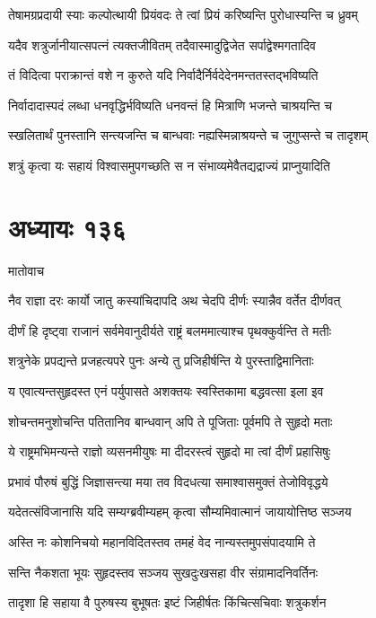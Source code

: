 \twolineshloka
{तेषामग्रप्रदायी स्याः कल्पोत्थायी प्रियंवदः}
{ते त्वां प्रियं करिष्यन्ति पुरोधास्यन्ति च ध्रुवम्}


\twolineshloka
{यदैव शत्रुर्जानीयात्सपत्नं त्यक्तजीवितम्}
{तदैवास्मादुद्विजेत सर्पाद्वेश्मगतादिव}


\twolineshloka
{तं विदित्वा पराक्रान्तं वशे न कुरुते यदि}
{निर्वादैर्निर्वदेदेनमन्ततस्तद्भविष्यति}


\twolineshloka
{निर्वादादास्पदं लब्धा धनवृद्धिर्भविष्यति}
{धनवन्तं हि मित्राणि भजन्ते चाश्रयन्ति च}


\twolineshloka
{स्खलितार्थं पुनस्तानि सन्त्यजन्ति च बान्धवाः}
{नह्यस्मिन्नाश्रयन्ते च जुगुप्सन्ते च तादृशम्}


\twolineshloka
{शत्रुं कृत्वा यः सहायं विश्वासमुपगच्छति}
{स न संभाव्यमेवैतद्यद्राज्यं प्राप्नुयादिति}


\chapter{अध्यायः १३६}
\twolineshloka
{मातोवाच}
{}


\twolineshloka
{नैव राज्ञा दरः कार्यो जातु कस्यांचिदापदि}
{अथ चेदपि दीर्णः स्यान्नैव वर्तेत दीर्णवत्}


\twolineshloka
{दीर्णं हि दृष्ट्वा राजानं सर्वमेवानुदीर्यते}
{राष्ट्रं बलममात्याश्च पृथक्कुर्वन्ति ते मतीः}


\twolineshloka
{शत्रुनेके प्रपद्यन्ते प्रजहत्यपरे पुनः}
{अन्ये तु प्रजिहीर्षन्ति ये पुरस्ताद्विमानिताः}


\twolineshloka
{य एवात्यन्तसुहृदस्त एनं पर्युपासते}
{अशक्तयः स्वस्तिकामा बद्धवत्सा इला इव}


\twolineshloka
{शोचन्तमनुशोचन्ति पतितानिव बान्धवान्}
{अपि ते पूजिताः पूर्वमपि ते सुहृदो मताः}


\twolineshloka
{ये राष्ट्रमभिमन्यन्ते राज्ञो व्यसनमीयुषः}
{मा दीदरस्त्वं सुहृदो मा त्वां दीर्णं प्रहासिषुः}


\twolineshloka
{प्रभावं पौरुषं बुद्धिं जिज्ञासन्त्या मया तव}
{विदधत्या समाश्वासमुक्तं तेजोविवृद्धये}


\twolineshloka
{यदेतत्संविजानासि यदि सम्यग्ब्रवीम्यहम्}
{कृत्वा सौम्यमिवात्मानं जायायोत्तिष्ठ सञ्जय}


\twolineshloka
{अस्ति नः कोशनिचयो महानविदितस्तव}
{तमहं वेद नान्यस्तमुपसंपादयामि ते}


\twolineshloka
{सन्ति नैकशता भूयः सुहृदस्तव सञ्जय}
{सुखदुःखसहा वीर संग्रामादनिवर्तिनः}


\twolineshloka
{तादृशा हि सहाया वै पुरुषस्य बुभूषतः}
{इष्टं जिहीर्षतः किंचित्सचिवाः शत्रुकर्शन}


